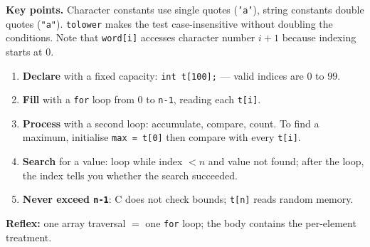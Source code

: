 \documentclass[11pt]{article}
\begin{document}
\begin{exoresolu}
\textbf{Key points.} Character constants use single quotes (\texttt{'a'}), string constants double quotes (\texttt{"a"}). \texttt{tolower} makes the test case-insensitive without doubling the conditions. Note that \texttt{word[i]} accesses character number $i+1$ because indexing starts at $0$.
\end{exoresolu}

\begin{methode}
\begin{enumerate}
\item \textbf{Declare} with a fixed capacity: \texttt{int t[100];} — valid indices are $0$ to $99$.
\item \textbf{Fill} with a \texttt{for} loop from $0$ to \texttt{n-1}, reading each \texttt{t[i]}.
\item \textbf{Process} with a second loop: accumulate, compare, count. To find a maximum, initialise \texttt{max = t[0]} then compare with every \texttt{t[i]}.
\item \textbf{Search} for a value: loop while index $< n$ and value not found; after the loop, the index tells you whether the search succeeded.
\item \textbf{Never exceed \texttt{n-1}}: C does not check bounds; \texttt{t[n]} reads random memory.
\end{enumerate}
\textbf{Reflex:} one array traversal $=$ one \texttt{for} loop; the body contains the per-element treatment.
\end{methode}
\end{document}
